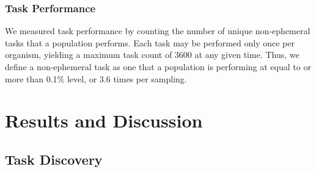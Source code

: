 \documentclass[PhD]{msu-thesis}
\begin{document}
\subsubsection{Task Performance}
We measured task performance by counting the number of unique non-ephemeral tasks that a population performs.  Each task may be performed only once per organism, yielding a maximum task count of 3600 at any given time. Thus, we define a non-ephemeral task as one that a population is performing at equal to or more than 0.1\% level, or 3.6 times per sampling. 

\section{Results and Discussion}

\subsection{Task Discovery}
\end{document}

